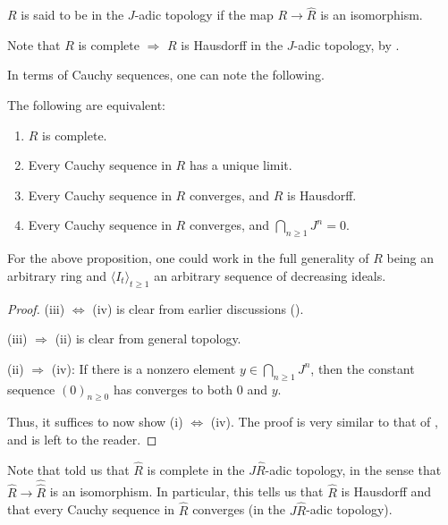 \documentclass[12pt]{article}
\begin{document}
\begin{defn}
	$R$ is said to be  in the $J$-adic topology if the map $R \to \widehat{R}$ is an isomorphism.
\end{defn}

\begin{rem}
	Note that $R$ is complete $\Rightarrow$ $R$ is Hausdorff in the $J$-adic topology, by .
\end{rem}

In terms of Cauchy sequences, one can note the following.

\begin{prop}
	The following are equivalent:
	\begin{enumerate}[label=(\roman*)]
		\item $R$ is complete.
		\item Every Cauchy sequence in $R$ has a unique limit.
		\item Every Cauchy sequence in $R$ converges, and $R$ is Hausdorff.
		\item Every Cauchy sequence in $R$ converges, and $\bigcap_{n \ge 1} J^{n} = 0$.
	\end{enumerate}
\end{prop}
For the above proposition, one could work in the full generality of $R$ being an arbitrary ring and $\langle I_{t} \rangle_{t \ge 1}$ an arbitrary sequence of decreasing ideals.
\begin{proof} 
	(iii) $\Leftrightarrow$ (iv) is clear from earlier discussions (). 

	(iii) $\Rightarrow$ (ii) is clear from general topology. 

	(ii) $\Rightarrow$ (iv): If there is a nonzero element $y \in \bigcap_{n \ge 1} J^{n}$, then the constant sequence $(0)_{n \ge 0}$ has converges to both $0$ and $y$.

	Thus, it suffices to now show (i) $\Leftrightarrow$ (iv). The proof is very similar to that of , and is left to the reader.
\end{proof}

Note that  told us that $\widehat{R}$ is complete in the $J \widehat{R}$-adic topology, in the sense that $\widehat{R} \to \widehat{\widehat{R}}$ is an isomorphism. In particular, this tells us that $\widehat{R}$ is Hausdorff and that every Cauchy sequence in $\widehat{R}$ converges (in the $J \widehat{R}$-adic topology). 
\end{document}
